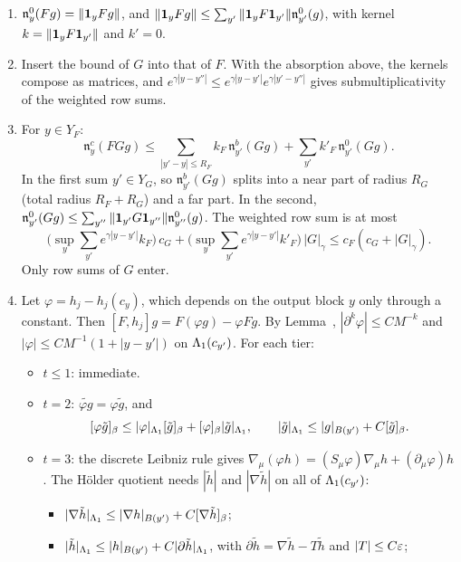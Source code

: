 \begin{detail}\label{d9:tier-calc}
\begin{enumerate}[label=(\alph*)]
\item $\mathfrak n^0_y(Fg)=\|\mathbf 1_yFg\|$, and $\|\mathbf 1_yFg\|\le\sum_{y'}\|\mathbf 1_yF\mathbf 1_{y'}\|\mathfrak n^0_{y'}(g)$, with kernel $k=\|\mathbf 1_yF\mathbf 1_{y'}\|$ and $k'=0$.
\item Insert the bound of $G$ into that of $F$. With the absorption above, the kernels compose as matrices, and $e^{\gamma|y-y''|}\le e^{\gamma|y-y'|}e^{\gamma|y'-y''|}$ gives submultiplicativity of the weighted row sums.
\item For $y\in Y_F$:
\[
\mathfrak n^c_y(FGg)\le\sum_{|y'-y|\le R_F}k_F\,\mathfrak n^b_{y'}(Gg)+\sum_{y'}k'_F\,\mathfrak n^0_{y'}(Gg) .
\]
In the first sum $y'\in Y_G$, so $\mathfrak n^b_{y'}(Gg)$ splits into a near part of radius $R_G$ (total radius $R_F+R_G$) and a far part. In the second, $\mathfrak n^0_{y'}(Gg)\le\sum_{y''}\|\mathbf 1_{y'}G\mathbf 1_{y''}\|\mathfrak n^0_{y''}(g)$. The weighted row sum is at most
\[
\Big(\sup_y\sum_{y'}e^{\gamma|y-y'|}k_F\Big)\,c_G+\Big(\sup_y\sum_{y'}e^{\gamma|y-y'|}k'_F\Big)\,|G|_\gamma\le c_F(c_G+|G|_\gamma) .
\]
Only row sums of $G$ enter.
\item Let $\varphi=h_j-h_j(c_y)$, which depends on the output block $y$ only through a constant. Then $[F,h_j]g=F(\varphi g)-\varphi Fg$. By Lemma~, $|\partial^k\varphi|\le CM^{-k}$ and $|\varphi|\le CM^{-1}(1+|y-y'|)$ on $\Lambda_1(c_{y'})$. For each tier:
\begin{itemize}
\item $t\le1$: immediate.
\item $t=2$: $\widetilde{\varphi g}=\varphi\tilde g$, and
\[
[\varphi\tilde g]_\beta\le|\varphi|_{\Lambda_1}[\tilde g]_\beta+[\varphi]_\beta|\tilde g|_{\Lambda_1},\qquad|\tilde g|_{\Lambda_1}\le|g|_{B(y')}+C[\tilde g]_\beta .
\]
\item $t=3$: the discrete Leibniz rule gives $\nabla_\mu(\varphi h)=(S_\mu\varphi)\nabla_\mu h+(\partial_\mu\varphi)h$. The H\"older quotient needs $|\tilde h|$ and $|\nabla\tilde h|$ on all of $\Lambda_1(c_{y'})$:
\begin{itemize}
\item $|\nabla\tilde h|_{\Lambda_1}\le|\nabla h|_{B(y')}+C[\nabla\tilde h]_\beta$;
\item $|\tilde h|_{\Lambda_1}\le|h|_{B(y')}+C|\partial\tilde h|_{\Lambda_1}$, with $\partial\tilde h=\nabla\tilde h-T\tilde h$ and $|T|\le C\varepsilon$;

\end{itemize}
\end{itemize}
\end{enumerate}
\end{detail}

